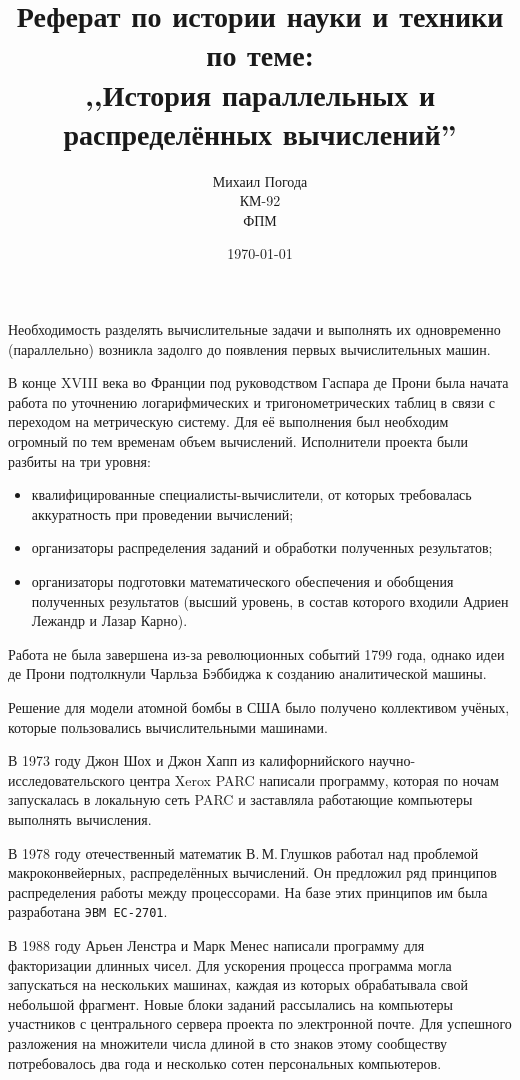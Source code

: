 \documentclass[a4paper,12pt,titlepage,pdftex,headsepline]{scrartcl}
\author{Михаил Погода\\
КМ-92\\
ФПМ}
\title{Реферат по истории науки и техники\\
по теме:\\
,,История параллельных и распределённых вычислений''}
\date{\today}
\begin{document}
\maketitle
Необходимость разделять вычислительные задачи и выполнять их одновременно (параллельно) возникла задолго до появления первых вычислительных машин.

В конце XVIII века во Франции под руководством Гаспара де Прони была начата работа по уточнению логарифмических и тригонометрических таблиц в связи с переходом на метрическую систему.
Для её выполнения был необходим огромный по тем временам объем вычислений.
Исполнители проекта были разбиты на три уровня:
\begin{itemize}
\item квалифицированные специалисты-вычислители, от которых требовалась аккуратность при проведении вычислений;
\item организаторы распределения заданий и обработки полученных результатов;
\item организаторы подготовки математического обеспечения и обобщения полученных результатов (высший уровень, в состав которого входили Адриен Лежандр и Лазар Карно).
\end{itemize}

Работа не была завершена из-за революционных событий 1799 года, однако идеи де Прони подтолкнули Чарльза Бэббиджа к созданию аналитической машины.

Решение для модели атомной бомбы в США было получено коллективом учёных, которые пользовались вычислительными машинами.

В 1973 году Джон Шох и Джон Хапп из калифорнийского научно-исследовательско\-го центра Xerox PARC написали программу, которая по ночам запускалась в локальную сеть PARC и заставляла работающие компьютеры выполнять вычисления.

В 1978 году отечественный математик В.\,М.\,Глушков работал над проблемой макроконвейерных, распределённых вычислений.
Он предложил ряд принципов распределения работы между процессорами.
На базе этих принципов им была разработана \texttt{ЭВМ ЕС-2701}.

В 1988 году Арьен Ленстра и Марк Менес написали программу для факторизации длинных чисел.
Для ускорения процесса программа могла запускаться на нескольких машинах, каждая из которых обрабатывала свой небольшой фрагмент. 
Новые блоки заданий рассылались на компьютеры участников с центрального сервера проекта по электронной почте.
Для успешного разложения на множители числа длиной в сто знаков этому сообществу потребовалось два года и несколько сотен персональных компьютеров.
\end{document}
